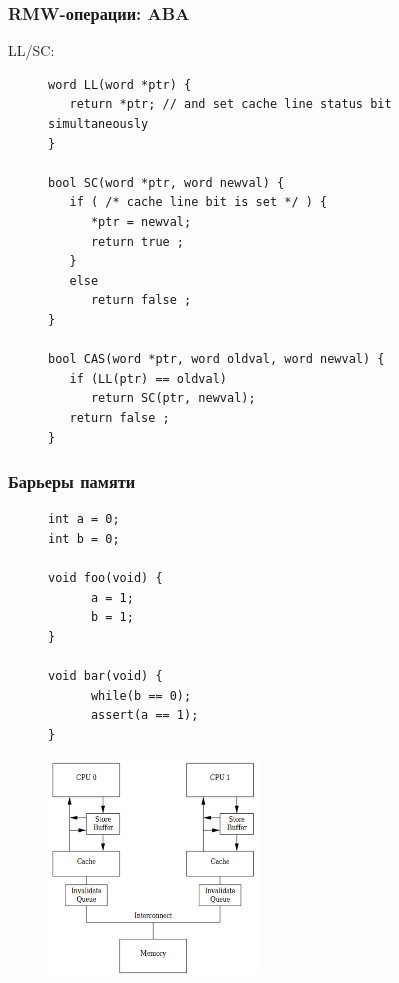 \documentclass[aspectratio=169, pdf, 8pt, unicode]{beamer}
\begin{document}
\begin{frame}[fragile]
\frametitle{RMW-операции: ABA}
LL/SC:
\begin{figure}[H]
\centering
\begin{minipage}{0.8\textwidth}
\begin{verbatim}
word LL(word *ptr) {
   return *ptr; // and set cache line status bit simultaneously
}

bool SC(word *ptr, word newval) {
   if ( /* cache line bit is set */ ) {
      *ptr = newval;
      return true ;
   }
   else
      return false ;
}

bool CAS(word *ptr, word oldval, word newval) {
   if (LL(ptr) == oldval)
      return SC(ptr, newval);
   return false ;
}
\end{verbatim}
\end{minipage}
\end{figure}
\end{frame}

\begin{frame}[fragile]
\frametitle{Барьеры памяти}
\hspace{0.05\textwidth}
\begin{minipage}{0.2\textwidth}
\begin{figure}[H]
\centering
\begin{BVerbatim}
int a = 0;
int b = 0;

void foo(void) {
      a = 1;
      b = 1;
}

void bar(void) {
      while(b == 0);
      assert(a == 1);
}
\end{BVerbatim}
\end{figure}
\end{minipage}
\begin{minipage}{0.7\textwidth}
\begin{figure}[H]
      \includegraphics[width=0.5\textwidth]{fig/store_buffers.png}
\end{figure}
\end{minipage}
\end{frame}
\end{document}
